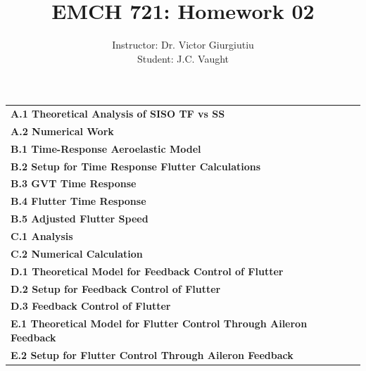 \documentclass[12pt]{article}
\title{EMCH 721: Homework 02}
\author{Instructor: Dr. Victor Giurgiutiu\\Student: J.C. Vaught}
\date{}
\begin{document}
\maketitle
\setlength{\parindent}{0pt}


\begin{center}
\begin{tcolorbox}[colback=white, colframe=gray!50!black, colbacktitle=gray!20!white,
                  coltitle=black, sharp corners, boxrule=1pt,
                  title=\Large\bfseries Table of Contents]
\begin{tabular}{p{}r}
\textbf{A.1 Theoretical Analysis of SISO TF vs SS} \dotfill & \textbf{\pageref{quest:A1}} \\
\textbf{A.2 Numerical Work} \dotfill & \textbf{\pageref{quest:A2}} \\
\textbf{B.1 Time-Response Aeroelastic Model} \dotfill & \textbf{\pageref{quest:B1}} \\
\textbf{B.2 Setup for Time Response Flutter Calculations} \dotfill & \textbf{\pageref{quest:B2}} \\
\textbf{B.3 GVT Time Response} \dotfill & \textbf{\pageref{quest:B3}} \\
\textbf{B.4 Flutter Time Response} \dotfill & \textbf{\pageref{quest:B4}} \\
\textbf{B.5 Adjusted Flutter Speed} \dotfill & \textbf{\pageref{quest:B5}} \\
\textbf{C.1 Analysis} \dotfill & \textbf{\pageref{quest:C1}} \\
\textbf{C.2 Numerical Calculation} \dotfill & \textbf{\pageref{quest:C2}} \\
\textbf{D.1 Theoretical Model for Feedback Control of Flutter} \dotfill & \textbf{\pageref{quest:D1}} \\
\textbf{D.2 Setup for Feedback Control of Flutter} \dotfill & \textbf{\pageref{quest:D2}} \\
\textbf{D.3 Feedback Control of Flutter} \dotfill & \textbf{\pageref{quest:D3}} \\
\textbf{E.1 Theoretical Model for Flutter Control Through Aileron Feedback} \dotfill & \textbf{\pageref{quest:E1}} \\
\textbf{E.2 Setup for Flutter Control Through Aileron Feedback} \dotfill & \textbf{\pageref{quest:E2}} \\

\end{tabular}
\end{tcolorbox}
\end{center}
\end{document}
